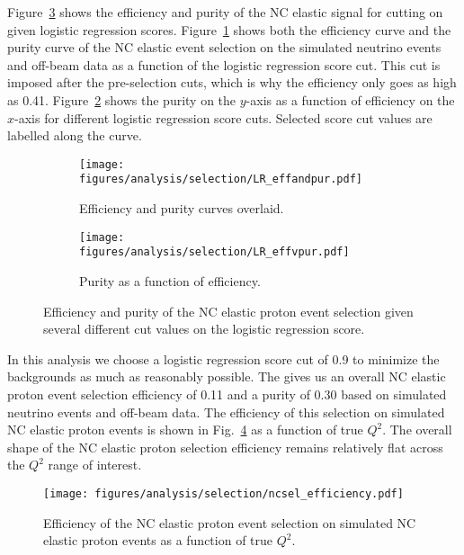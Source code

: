     Figure~\ref{fig:lreffpur} shows the efficiency and purity of the NC elastic
    signal for cutting on given logistic regression scores.
    Figure~\ref{fig:lreffnpur} shows both the efficiency curve and the purity
    curve of the NC elastic event selection on the simulated neutrino events
    and off-beam data as a function of the logistic regression score cut. This
    cut is imposed after the pre-selection cuts, which is why the efficiency
    only goes as high as 0.41. Figure~\ref{fig:lreffvpur} shows the purity on
    the $y$-axis as a function of efficiency on the $x$-axis for different
    logistic regression score cuts. Selected score cut values are labelled
    along the curve.
    \begin{figure}[h]
      \centering
      \begin{subfigure}[t]{2.8in}
        \texttt{[image: figures/analysis/selection/LR\_effandpur.pdf]}\hspace{2pc}%
        \caption{Efficiency and purity curves overlaid.}
        \label{fig:lreffnpur}
      \end{subfigure}
      \hspace{2pt}
      \begin{subfigure}[t]{2.8in}
        \texttt{[image: figures/analysis/selection/LR\_effvpur.pdf]}\hspace{2pc}%
        \caption{Purity as a function of efficiency.}
        \label{fig:lreffvpur}
      \end{subfigure}
      \caption{Efficiency and purity of the NC elastic proton event selection
      given several different cut values on the logistic regression score.
      \label{fig:lreffpur}}
    \end{figure}
   
    In this analysis we choose a logistic regression score cut of 0.9 to
    minimize the backgrounds as much as reasonably possible. The gives us an
    overall NC elastic proton event selection efficiency of 0.11 and a purity
    of 0.30 based on simulated neutrino events and off-beam data. The
    efficiency of this selection on simulated NC elastic proton events is shown
    in Fig.~\ref{fig:nceeff} as a function of true $Q^2$. The overall shape of
    the NC elastic proton selection efficiency remains relatively flat across
    the $Q^2$ range of interest.
    \begin{figure}[ht]
      \centering
      \texttt{[image: figures/analysis/selection/ncsel\_efficiency.pdf]}
      \caption{Efficiency of the NC elastic proton event selection on simulated
      NC elastic proton events as a function of true $Q^2$.}
      \label{fig:nceeff}
    \end{figure}

